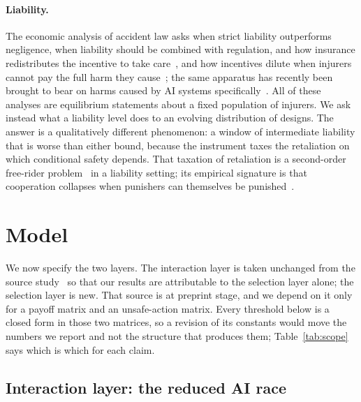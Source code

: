 \documentclass[pdflatex]{sn-jnl}
\theoremstyle{thmstyleone}
\theoremstyle{thmstylethree}
\theoremstyle{thmstyletwo}
\begin{document}
\paragraph{Liability.}
The economic analysis of accident law asks when strict liability outperforms
negligence, when liability should be combined with regulation, and how
insurance redistributes the incentive to take
care~\citep{shavell1980strict,shavell1984model,shavell1982insurance}, and how
incentives dilute when injurers cannot pay the full harm they
cause~\citep{shavell1986judgment}; the
same apparatus has recently been brought to bear on harms caused by AI
systems specifically~\citep{chagalfeferkorn2019algorithm,buiten2023liability,hacker2023liability,weil2024tort}. All of these analyses are
equilibrium
statements about a fixed population of injurers. We ask instead what a
liability level does to an evolving distribution of designs. The answer is a
qualitatively different phenomenon: a window of intermediate liability that is
worse than either bound, because the instrument taxes the retaliation on which
conditional safety depends. That taxation of retaliation is a second-order
free-rider problem~\citep{panchanathan2004secondorder,sigmund2010institutions} in a liability
setting; its empirical signature is that cooperation collapses when punishers
can themselves be punished~\citep{herrmann2008antisocial,nikiforakis2008counterpunishment}.

\section{Model}\label{sec:model}

We now specify the two layers. The interaction layer is taken unchanged from
the source study~\citep{domingos2026falling} so that our results are
attributable to the selection layer alone; the selection layer is new. That
source is at preprint stage, and we depend on it only for a payoff matrix and
an unsafe-action matrix. Every threshold below is a closed form in those two
matrices, so a revision of its constants would move the numbers we report and
not the structure that produces them; Table~\ref{tab:scope} says which is
which for each claim.

\subsection{Interaction layer: the reduced AI race}
\end{document}
